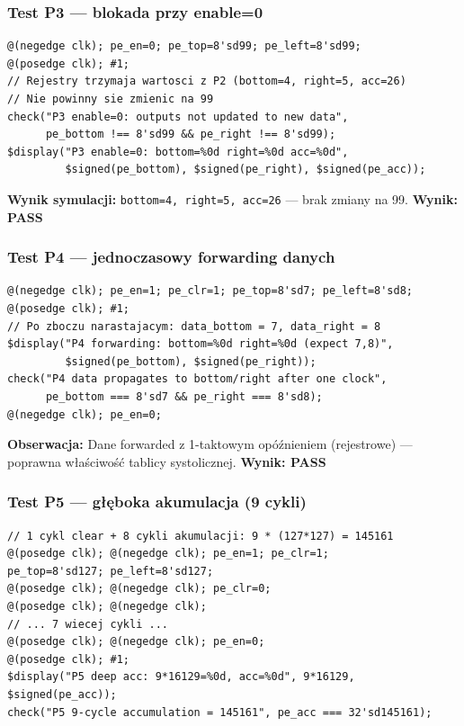 \documentclass[12pt,a4paper]{article}
\begin{document}
\subsubsection*{Test P3 — blokada przy enable=0}

\begin{lstlisting}
@(negedge clk); pe_en=0; pe_top=8'sd99; pe_left=8'sd99;
@(posedge clk); #1;
// Rejestry trzymaja wartosci z P2 (bottom=4, right=5, acc=26)
// Nie powinny sie zmienic na 99
check("P3 enable=0: outputs not updated to new data",
      pe_bottom !== 8'sd99 && pe_right !== 8'sd99);
$display("P3 enable=0: bottom=%0d right=%0d acc=%0d",
         $signed(pe_bottom), $signed(pe_right), $signed(pe_acc));
\end{lstlisting}

\textbf{Wynik symulacji:} \texttt{bottom=4, right=5, acc=26} — brak zmiany na 99. \textbf{Wynik: PASS}

\subsubsection*{Test P4 — jednoczasowy forwarding danych}

\begin{lstlisting}
@(negedge clk); pe_en=1; pe_clr=1; pe_top=8'sd7; pe_left=8'sd8;
@(posedge clk); #1;
// Po zboczu narastajacym: data_bottom = 7, data_right = 8
$display("P4 forwarding: bottom=%0d right=%0d (expect 7,8)",
         $signed(pe_bottom), $signed(pe_right));
check("P4 data propagates to bottom/right after one clock",
      pe_bottom === 8'sd7 && pe_right === 8'sd8);
@(negedge clk); pe_en=0;
\end{lstlisting}

\textbf{Obserwacja:} Dane forwarded z 1-taktowym opóźnieniem (rejestrowe) — poprawna właściwość tablicy systolicznej. \textbf{Wynik: PASS}

\subsubsection*{Test P5 — głęboka akumulacja (9 cykli)}

\begin{lstlisting}
// 1 cykl clear + 8 cykli akumulacji: 9 * (127*127) = 145161
@(posedge clk); @(negedge clk); pe_en=1; pe_clr=1;
pe_top=8'sd127; pe_left=8'sd127;
@(posedge clk); @(negedge clk); pe_clr=0;
@(posedge clk); @(negedge clk);
// ... 7 wiecej cykli ...
@(posedge clk); @(negedge clk); pe_en=0;
@(posedge clk); #1;
$display("P5 deep acc: 9*16129=%0d, acc=%0d", 9*16129, $signed(pe_acc));
check("P5 9-cycle accumulation = 145161", pe_acc === 32'sd145161);
\end{lstlisting}
\end{document}
